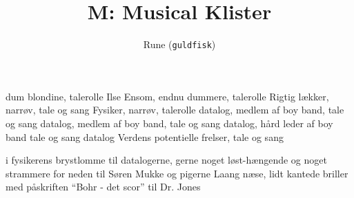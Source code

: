 \documentclass[danish]{article}
\title{M: Musical Klister}
\author{Rune (\texttt{guldfisk})}
\begin{document}
\maketitle

\begin{roles}
   dum blondine, talerolle
   Ilse Ensom, endnu dummere, talerolle
   Rigtig lækker, narrøv, tale og sang
   Fysiker, narrøv, talerolle
   datalog, medlem af boy band, tale og sang
   datalog, medlem af boy band, tale og sang
   datalog, hård leder af boy band tale og sang
   datalog
   Verdens potentielle frelser, tale og sang
\end{roles}

\begin{props}
   i fysikerens brystlomme
   til datalogerne, gerne noget løst-hængende og noget strammere for 
neden
   til Søren Mukke og pigerne
   Laang næse, lidt kantede briller
   med påskriften ``Bohr - det scor''
   til Dr. Jones
\end{props}
\end{document}
